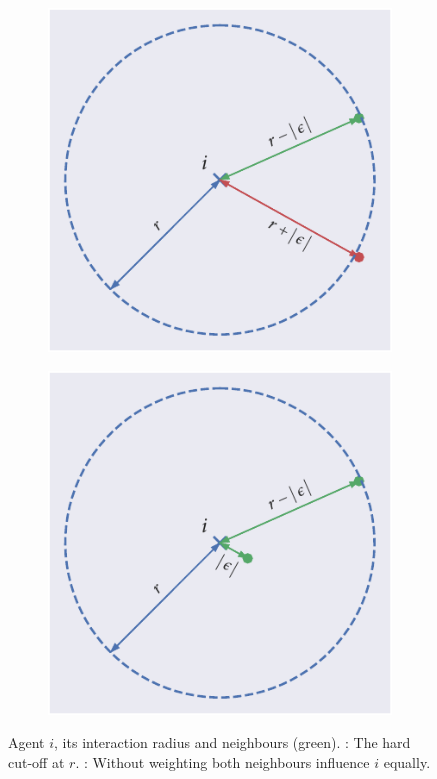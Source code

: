 \begin{figure}[!tbp]
	\begin{subfigure}[b]{0.45\textwidth}
		\includegraphics{no_interact.pdf}
		\caption{}
		\label{subfig:no_interact}
	\end{subfigure}%
	\hspace{0.05\textwidth}
	\begin{subfigure}[b]{0.45\textwidth}
		\includegraphics{interact.pdf}
		\caption{}
		\label{subfig:interact}
	\end{subfigure}
	\caption{Agent $i$, its interaction radius and neighbours (green). : The hard cut-off at $r$. : Without weighting both neighbours influence $i$ equally.}
\end{figure}

